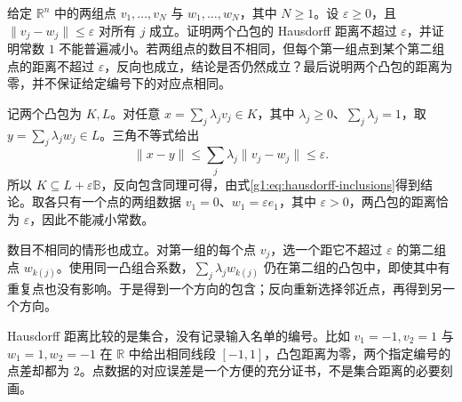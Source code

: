 \begin{exercise}\label{g1:ex:perturbed-vertex-hulls}
	给定 \(\mathbb R^n\) 中的两组点 \(v_1,\ldots,v_N\) 与 \(w_1,\ldots,w_N\)，其中 \(N\ge1\)。设 \(\varepsilon\ge0\)，且 \(\lVert v_j-w_j\rVert\le\varepsilon\) 对所有 \(j\) 成立。证明两个凸包的 Hausdorff 距离不超过 \(\varepsilon\)，并证明常数 \(1\) 不能普遍减小。若两组点的数目不相同，但每个第一组点到某个第二组点的距离不超过 \(\varepsilon\)，反向也成立，结论是否仍然成立？最后说明两个凸包的距离为零，并不保证给定编号下的对应点相同。
\end{exercise}
\begin{solution}
	记两个凸包为 \(K,L\)。对任意 \(x=\sum_j\lambda_jv_j\in K\)，其中 \(\lambda_j\ge0\)、\(\sum_j\lambda_j=1\)，取 \(y=\sum_j\lambda_jw_j\in L\)。三角不等式给出
	\[
		\lVert x-y\rVert
		\le\sum_j\lambda_j\lVert v_j-w_j\rVert\le\varepsilon.
	\]
	所以 \(K\subseteq L+\varepsilon\mathbb B\)，反向包含同理可得，由式\eqref{g1:eq:hausdorff-inclusions}得到结论。取各只有一个点的两组数据 \(v_1=0\)、\(w_1=\varepsilon e_1\)，其中 \(\varepsilon>0\)，两凸包的距离恰为 \(\varepsilon\)，因此不能减小常数。

	数目不相同的情形也成立。对第一组的每个点 \(v_j\)，选一个距它不超过 \(\varepsilon\) 的第二组点 \(w_{k(j)}\)。使用同一凸组合系数，\(\sum_j\lambda_jw_{k(j)}\) 仍在第二组的凸包中，即使其中有重复点也没有影响。于是得到一个方向的包含；反向重新选择邻近点，再得到另一个方向。

	Hausdorff 距离比较的是集合，没有记录输入名单的编号。比如 \(v_1=-1,v_2=1\) 与 \(w_1=1,w_2=-1\) 在 \(\mathbb R\) 中给出相同线段 \([-1,1]\)，凸包距离为零，两个指定编号的点差却都为 \(2\)。点数据的对应误差是一个方便的充分证书，不是集合距离的必要刻画。
\end{solution}

